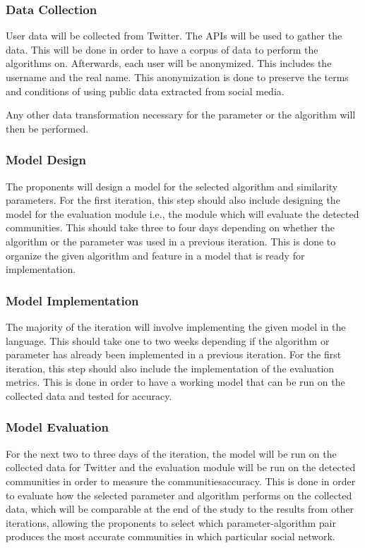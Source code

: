 \subsubsection{Data Collection}

User data will be collected from Twitter. The API\vtick s will be used to gather the data. This will be done in order to have a corpus of data to perform the algorithms on. Afterwards, each user will be anonymized. This includes the username and the real name.  This anonymization is done to preserve the terms and conditions of using public data extracted from social media. 

Any other data transformation necessary for the parameter or the algorithm will then be performed.

\subsubsection{Model Design}

The proponents will design a model for the selected algorithm and similarity parameters. For the first iteration, this step should also include designing the model for the evaluation module i.e., the module which will evaluate the detected communities. This should take three to four days depending on whether the algorithm or the parameter was used in a previous iteration. This is done to organize the given algorithm and feature in a model that is ready for implementation.

\subsubsection{Model Implementation}

The majority of the iteration will involve implementing the given model in the language. This should take one to two weeks depending if the algorithm or parameter has already been implemented in a previous iteration. For the first iteration, this step should also include the implementation of the evaluation metrics. This is done in order to have a working model that can be run on the collected data and tested for accuracy.

\subsubsection{Model Evaluation}

For the next two to three days of the iteration, the model will be run on the collected data for Twitter and the evaluation module will be run on the detected communities in order to measure the communities\vtick accuracy. This is done in order to evaluate how the selected parameter and algorithm performs on the collected data, which will be comparable at the end of the study to the results from other iterations, allowing the proponents to select which parameter-algorithm pair produces the most accurate communities in which particular social network.

